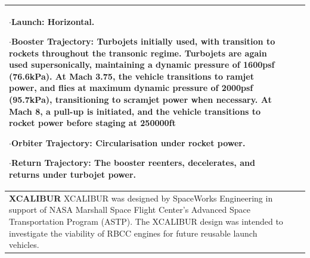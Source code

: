 {\begin{landscape}
\begin{xltabular}{\linewidth}{|X|X|X|}
	$\cdot$\textbf{Launch:} Horizontal.
	
	$\cdot$\textbf{Booster Trajectory:} Turbojets initially used, with transition to rockets throughout the transonic regime. Turbojets are again used supersonically, maintaining a dynamic pressure of 1600psf (76.6kPa). At Mach 3.75, the vehicle transitions to ramjet power, and flies at maximum dynamic pressure of 2000psf (95.7kPa), transitioning to scramjet power when necessary. At Mach 8, a pull-up is initiated, and the vehicle transitions to rocket power before staging at 250000ft
	
	$\cdot$\textbf{Orbiter Trajectory:}  Circularisation under rocket power. 
	
	$\cdot$\textbf{Return Trajectory:} The booster reenters, decelerates, and returns under turbojet power.  
	\\
	
	\hline \small 
	\textbf{XCALIBUR}\cite{Bradford2002}\newline\newline
	XCALIBUR was designed by SpaceWorks Engineering in support of NASA Marshall Space Flight Center’s Advanced Space Transportation Program (ASTP). The XCALIBUR design was intended to investigate the viability of RBCC engines for future reusable launch vehicles. 
	&\small
	

\end{xltabular}
\end{landscape}}
